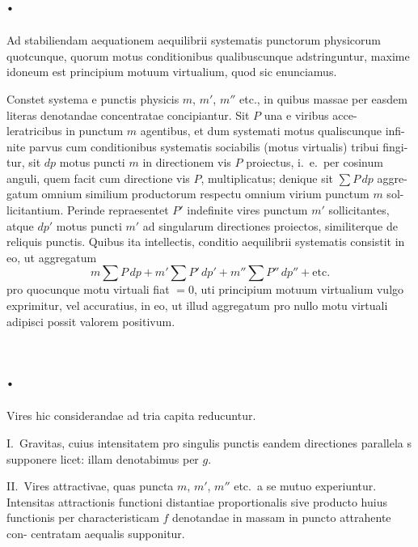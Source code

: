 \documentclass[12pt,a4paper]{article}
\theoremstyle{gauss}
\begin{document}
\newpage
\setcounter{page}{35}

\section*{%
%
\thesection.}

Ad stabiliendam aequationem aequilibrii systematis punctorum physicorum
quotcunque, quorum motus conditionibus qualibuscunque adstringuntur, maxime
idoneum est principium motuum virtualium, quod sic enunciamus.

Constet systema e punctis physicis $m$, $m'$, $m''$ etc., in quibus massae per
easdem literas denotandae concentratae concipiantur. Sit $P$ una e viribus acce-
leratricibus in punctum $m$ agentibus, et dum systemati motus qualiscunque infi-
nite parvus cum conditionibus systematis sociabilis (motus virtualis) tribui fingi-
tur, sit $dp$ motus puncti $m$ in directionem vis $P$ proiectus, i.~e.~per cosinum
anguli, quem facit cum directione vis $P$, multiplicatus; denique sit $\sum P\,dp$ aggre-
gatum omnium similium productorum respectu omnium virium punctum $m$ sol-
licitantium. Perinde repraesentet $P'$ indefinite vires punctum $m'$ sollicitantes,
atque $dp'$ motus puncti $m'$ ad singularum directiones proiectos, similiterque de
reliquis punctis. Quibus ita intellectis, conditio aequilibrii systematis consistit
in eo, ut aggregatum
\[
m\sum P\,dp + m'\sum P'\,dp' + m''\sum P''\,dp'' + \text{etc.}
\]
pro quocunque motu virtuali fiat $=0$, uti principium motuum virtualium vulgo
exprimitur, vel accuratius, in eo, ut illud aggregatum pro nullo motu virtuali
adipisci possit valorem positivum.

\section*{%
%
\thesection.}

Vires hic considerandae ad tria capita reducuntur.

I.~Gravitas, cuius intensitatem pro singulis punctis eandem directiones
parallela
s supponere licet: illam denotabimus per $g$.

II.~Vires attractivae, quas puncta $m$, $m'$, $m''$ etc.~a se mutuo experiuntur.
Intensitas attractionis functioni distantiae proportionalis sive producto huius
functionis per characteristicam $f$ denotandae in massam in puncto attrahente con-
centratam aequalis supponitur.
\end{document}
